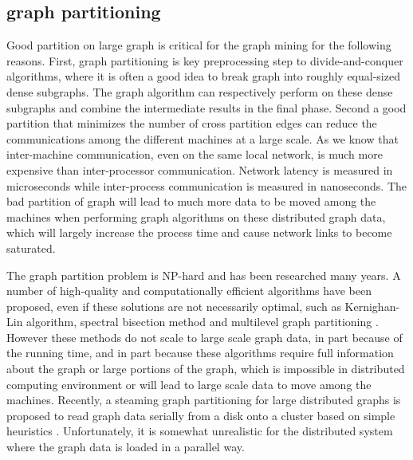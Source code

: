 \documentclass{acm_proc_article-sp}
\begin{document}
\subsection{graph partitioning}
 Good partition on large graph is critical for the graph mining for the following reasons. First, graph partitioning is key preprocessing step to divide-and-conquer algorithms, where it is often a good idea to break graph into roughly equal-sized dense subgraphs. The graph algorithm can respectively perform on these dense subgraphs and combine the intermediate results in the final phase. Second a good partition that minimizes the number of cross partition edges can reduce the communications among the different machines at a large scale. As we know that inter-machine communication, even on the same local network, is much more expensive than inter-processor communication. Network latency is measured in microseconds while inter-process communication is measured in nanoseconds. The bad partition of graph will lead to much more data to be moved among the machines when performing graph algorithms on these distributed graph data, which will largely increase the process time and cause network links to become saturated.
\par
 The graph partition problem is NP-hard and has been researched many years. A number of high-quality and computationally efficient algorithms have been proposed, even if these solutions are not necessarily optimal, such as Kernighan-Lin algorithm, spectral bisection method and multilevel graph partitioning \cite{kl:partition,barnard:mrsb,karypis:multi1}. However these methods do not scale to large scale graph data, in part because of the running time, and in part because these algorithms require full information about the graph or large portions of the graph, which is impossible in distributed computing environment or will lead to large scale data to move among the machines. Recently, a steaming graph partitioning for large distributed graphs is proposed to read graph data serially from a disk onto a cluster based on simple heuristics \cite{url:streaming}. Unfortunately, it is somewhat unrealistic for the distributed system where the graph data is loaded in a parallel way.
\end{document}
